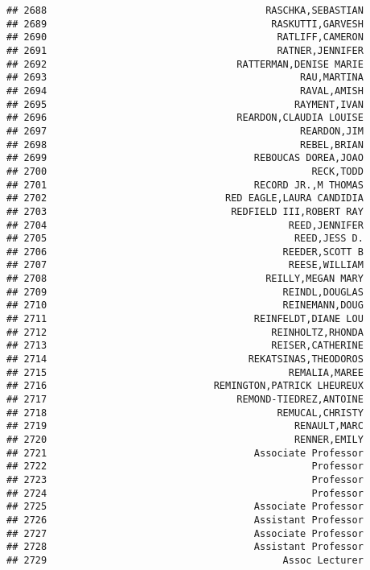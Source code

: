 \documentclass[
]{article}
\begin{document}
\begin{verbatim}
## 2688                                      RASCHKA,SEBASTIAN
## 2689                                       RASKUTTI,GARVESH
## 2690                                        RATLIFF,CAMERON
## 2691                                        RATNER,JENNIFER
## 2692                                 RATTERMAN,DENISE MARIE
## 2693                                            RAU,MARTINA
## 2694                                            RAVAL,AMISH
## 2695                                           RAYMENT,IVAN
## 2696                                 REARDON,CLAUDIA LOUISE
## 2697                                            REARDON,JIM
## 2698                                            REBEL,BRIAN
## 2699                                    REBOUCAS DOREA,JOAO
## 2700                                              RECK,TODD
## 2701                                    RECORD JR.,M THOMAS
## 2702                               RED EAGLE,LAURA CANDIDIA
## 2703                                REDFIELD III,ROBERT RAY
## 2704                                          REED,JENNIFER
## 2705                                           REED,JESS D.
## 2706                                         REEDER,SCOTT B
## 2707                                          REESE,WILLIAM
## 2708                                      REILLY,MEGAN MARY
## 2709                                         REINDL,DOUGLAS
## 2710                                         REINEMANN,DOUG
## 2711                                    REINFELDT,DIANE LOU
## 2712                                       REINHOLTZ,RHONDA
## 2713                                       REISER,CATHERINE
## 2714                                   REKATSINAS,THEODOROS
## 2715                                          REMALIA,MAREE
## 2716                             REMINGTON,PATRICK LHEUREUX
## 2717                                 REMOND-TIEDREZ,ANTOINE
## 2718                                        REMUCAL,CHRISTY
## 2719                                           RENAULT,MARC
## 2720                                           RENNER,EMILY
## 2721                                    Associate Professor
## 2722                                              Professor
## 2723                                              Professor
## 2724                                              Professor
## 2725                                    Associate Professor
## 2726                                    Assistant Professor
## 2727                                    Associate Professor
## 2728                                    Assistant Professor
## 2729                                         Assoc Lecturer

\end{verbatim}
\end{document}
